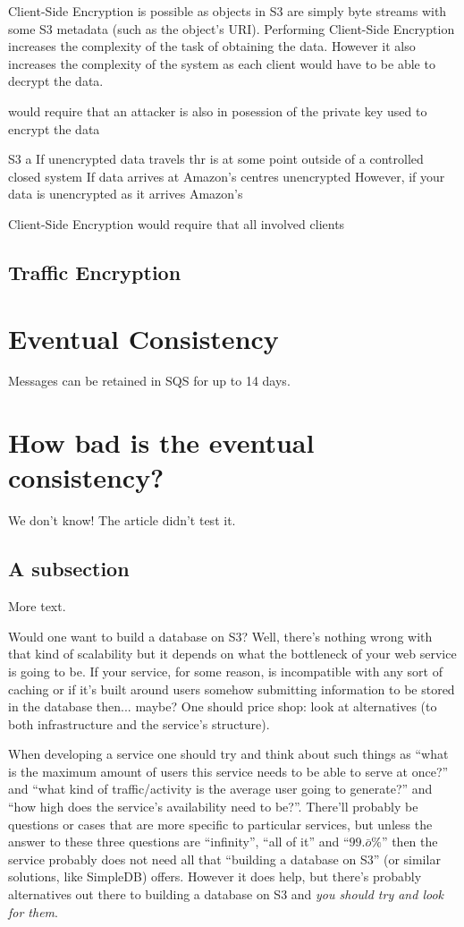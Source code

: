\documentclass[11pt]{article}
\begin{document}
Client-Side Encryption is possible as objects in S3 are simply byte streams with some S3 metadata (such as the object's URI).
Performing Client-Side Encryption increases the complexity of the task of obtaining the data.
However it also increases the complexity of the system as each client would have to be able to decrypt the data.


would require that an attacker is also in posession of the private key used to encrypt the data 

S3 a
If unencrypted data travels thr
is at some point outside of a controlled closed system 
If data arrives at Amazon's centres unencrypted 
However, if your data is unencrypted as it arrives Amazon's 

Client-Side Encryption would require that all involved clients 

\subsection{Traffic Encryption}


\section{Eventual Consistency}
Messages can be retained in SQS for up to 14 days.

\section{How bad is the eventual consistency?}
We don't know! The article didn't test it.

\subsection{A subsection}

More text.

Would one want to build a database on S3?
Well, there's nothing wrong with that kind of scalability but it depends on what the bottleneck of your web service is going to be.
If your service, for some reason, is incompatible with any sort of caching or if it's built around users somehow submitting information to be stored in the database then... maybe?
One should price shop: look at alternatives (to both infrastructure and the service's structure).

When developing a service one should try and think about such things as ``what is the maximum amount of users this service needs to be able to serve at once?'' and ``what kind of traffic/activity is the average user going to generate?'' and ``how high does the service's availability need to be?''.
There'll probably be questions or cases that are more specific to particular services, but unless the answer to these three questions are ``infinity'', ``all of it'' and ``$99.\bar{o}\%$'' then the service probably does not need all that ``building a database on S3'' (or similar solutions, like SimpleDB) offers.
However it does help, but there's probably alternatives out there to building a database on S3 and \textit{you should try and look for them}.
\end{document}
